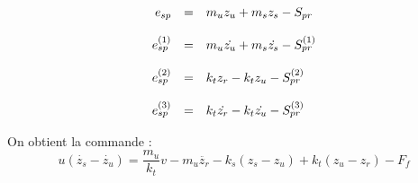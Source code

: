 \documentclass[10pt]{article}
\begin{document}
\[
\begin{array}{r c l}
  e_{sp} &=& m_u z_u + m_s z_s - S_{pr} \\
  \\
  e_{sp}^{(1)} &=& m_u \dot{z_u} + m_s \dot{z_s} - S_{pr}^{(1)} \\
  \\
  e_{sp}^{(2)} &=& k_t z_r - k_t z_u - S_{pr}^{(2)} \\
  \\
  e_{sp}^{(3)} &=& k_t \dot{z_r} - k_t \dot{z_u} - S_{pr}^{(3)} \\
\end{array}
\]

On obtient la commande :
\[
u \left( \dot{z_s} - \dot{z_u} \right) = \dfrac{m_u}{k_t} v - m_u \ddot{z_r} - k_s \left( z_s - z_u \right) + k_t \left( z_u - z_r \right) - F_f
\]
\end{document}
